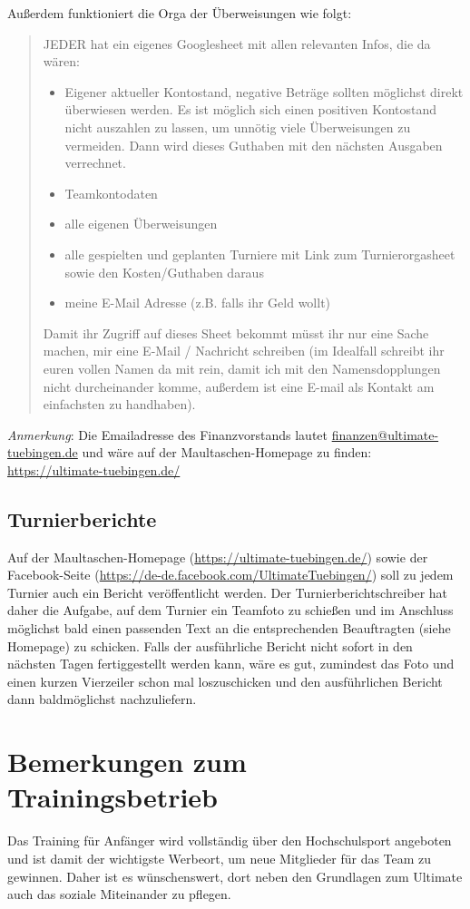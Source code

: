 \documentclass[a4 paper, 11pt]{article}
\begin{document}
Außerdem funktioniert die Orga der Überweisungen wie folgt:
\begin{quote}
	JEDER hat ein eigenes Googlesheet mit allen relevanten Infos, die da wären:
	\begin{itemize}
		\item Eigener aktueller Kontostand, negative Beträge sollten möglichst direkt überwiesen werden. Es ist möglich sich einen positiven Kontostand nicht auszahlen zu lassen, um unnötig viele Überweisungen zu vermeiden. Dann wird dieses Guthaben mit den nächsten Ausgaben verrechnet.
		\item Teamkontodaten
		\item alle eigenen Überweisungen
		\item alle gespielten und geplanten Turniere mit Link zum Turnierorgasheet sowie den Kosten/Guthaben daraus
		\item meine E-Mail Adresse (z.B. falls ihr Geld wollt)
	\end{itemize}
	Damit ihr Zugriff auf dieses Sheet bekommt müsst ihr nur eine Sache machen, mir eine E-Mail / Nachricht schreiben (im Idealfall schreibt ihr euren vollen Namen da mit rein, damit ich mit den Namensdopplungen nicht durcheinander komme, außerdem ist eine E-mail als Kontakt am einfachsten zu handhaben).
\end{quote}

\emph{Anmerkung}: Die Emailadresse des Finanzvorstands lautet \href{mailto:finanzen@ultimate-tuebingen.de}{finanzen@ultimate-tuebingen.de} und wäre auf der Maultaschen-Homepage zu finden: \url{https://ultimate-tuebingen.de/}

\subsection{Turnierberichte}
Auf der Maultaschen-Homepage (\url{https://ultimate-tuebingen.de/}) sowie der Facebook-Seite (\url{https://de-de.facebook.com/UltimateTuebingen/}) soll zu jedem Turnier auch ein Bericht veröffentlicht werden. Der Turnierberichtschreiber hat daher die Aufgabe, auf dem Turnier ein Teamfoto zu schießen und im Anschluss möglichst bald einen passenden Text an die entsprechenden Beauftragten (siehe Homepage) zu schicken. Falls der ausführliche Bericht nicht sofort in den nächsten Tagen fertiggestellt werden kann, wäre es gut, zumindest das Foto und einen kurzen Vierzeiler schon mal loszuschicken und den ausführlichen Bericht dann baldmöglichst nachzuliefern.


\section{Bemerkungen zum Trainingsbetrieb}
Das Training für Anfänger wird vollständig über den Hochschulsport angeboten und ist damit der wichtigste \glqq Werbeort\grqq, um neue Mitglieder für das Team zu gewinnen. Daher ist es wünschenswert, dort neben den Grundlagen zum Ultimate auch das soziale Miteinander zu pflegen.
\end{document}
